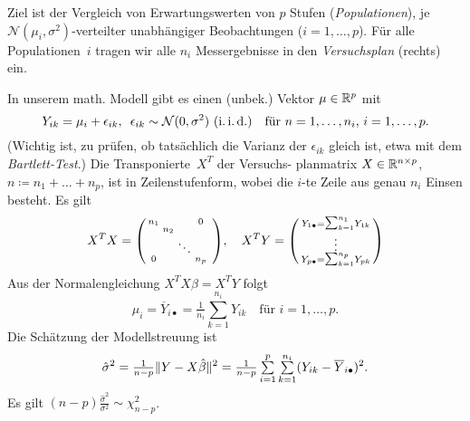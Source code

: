 \documentclass{cheat-sheet}
\newcommand{\iid}{i.\,i.\,d.} %
\newcommand{\Normal}{\mathcal{N}} %
\begin{document}
  \begin{minipage}{0.52 \linewidth}
    \begin{bsp}
      Ziel ist der Vergleich von Erwartungswerten von $p$ Stufen (\textit{Populationen}), je $\Normal(\mu_i, \sigma^2)$-verteilter unabhängiger Beobachtungen ($i = 1, \ldots, p$).
      Für alle Populationen~$i$ tragen wir alle $n_i$ Messergebnisse in den \textit{Versuchsplan} (rechts) ein.
    \end{bsp}
  \end{minipage} \quad
  \begin{minipage}{0.43 \linewidth}
    \renewcommand{\arraystretch}{1.5}
  \end{minipage}
  \vspace{4pt}
  In unserem math. Modell gibt es einen (unbek.) Vektor $\mu \in \mathbb{R}^p$ mit
  \[
    Y_{ik} = \mu_i + \epsilon_{ik}, \enspace
    \epsilon_{ik} \sim \Normal(0, \sigma^2) \text{ (\iid{})} \quad
    \text{für $n = 1, \ldots, n_i$, $i = 1, \ldots, p$.}
  \]
  (Wichtig ist, zu prüfen, ob tatsächlich die Varianz der $\epsilon_{ik}$ gleich ist, etwa mit dem \textit{Bartlett-Test}.)
  Die Transponierte~$X^T$ der Versuchs- planmatrix $X \in \mathbb{R}^{n \times p}$, $n \coloneqq n_1 + \ldots + n_p$, ist in Zeilenstufenform, wobei die $i$-te Zeile aus genau $n_i$ Einsen besteht.
  Es gilt
  \[
    X^T X = \begin{psmallmatrix}
      n_1 &&& 0 \\
      & n_2 && \\
      && \ddots && \\
      0 &&& n_p
    \end{psmallmatrix}, \quad
    X^T Y = \begin{psmallmatrix}
      Y_{1 \bullet} = {\sum}_{k=1}^{n_1} Y_{1k} \\
      \vdots \\
      Y_{p \bullet} = {\sum}_{k=1}^{n_p} Y_{pk}
    \end{psmallmatrix}
  \]
  Aus der Normalengleichung $X^T X \beta = X^T Y$ folgt
  \[
    \hat{\mu}_i = \overline{Y}_{i \bullet} = \tfrac{1}{n_i} {\sum}_{k=1}^{n_i} Y_{ik} \quad
    \text{für $i = 1, \ldots, p$}.
  \]
  Die Schätzung der Modellstreuung ist
  \[
    \hat{\sigma}^2 = \tfrac{1}{n-p} \norm{Y - X \hat{\beta}}^2 = \tfrac{1}{n-p} \sum_{i=1}^p \sum_{k=1}^{n_i} (Y_{ik} - \overline{Y}_{i \bullet})^2.
  \]
  Es gilt $(n-p) \tfrac{\hat{\sigma}^2}{\sigma^2} \sim \chi_{n-p}^2$.
\end{document}
